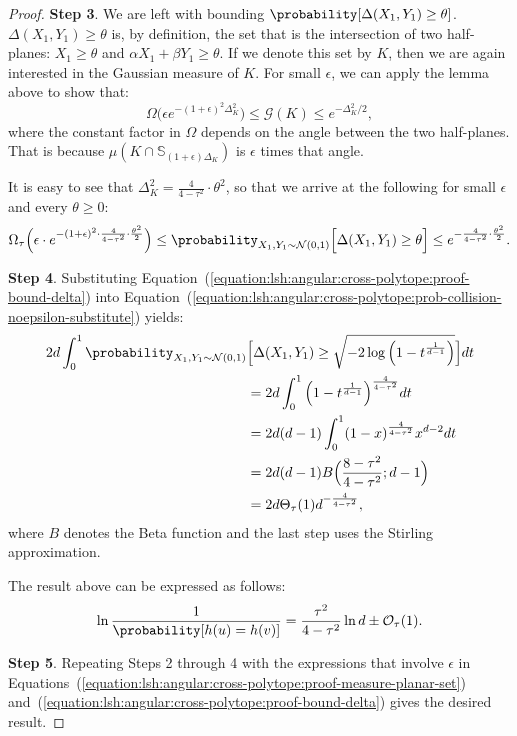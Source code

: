 \begin{proof}
    \textbf{Step 3}. We are left with bounding $\probability[ \Delta(X_1, Y_1) \geq \theta ]$.
    $\Delta(X_1, Y_1) \geq \theta$ is, by definition, the set that is the intersection of two
    half-planes: $X_1 \geq \theta$ and $\alpha X_1 + \beta Y_1 \geq \theta$. If we denote this set
    by $K$, then we are again interested in the Gaussian measure of $K$. For small $\epsilon$,
    we can apply the lemma above to show that:
    \begin{equation}
        \Omega \Big( \epsilon e^{-(1 + \epsilon)^2 \Delta_K^2} \Big) \leq \mathcal{G}(K) \leq e^{-\Delta^2_K /2},
    \end{equation}
    where the constant factor in $\Omega$ depends on the angle between the two half-planes. That is
    because $\mu(K \cap \mathbb{S}_{(1+ \epsilon) \Delta_K})$ is $\epsilon$ times that angle.

    It is easy to see that $\Delta_K^2 = \frac{4}{4 - \tau^2} \cdot \theta^2$, so that we arrive at the following
    for small $\epsilon$ and every $\theta \geq 0$:
    \begin{equation}
        \label{equation:lsh:angular:cross-polytope:proof-bound-delta}
        \Omega_\tau \Big( \epsilon \cdot e^{-(1 + \epsilon)^2 \cdot \frac{4}{4 - \tau^2}\cdot \frac{\theta^2}{2}} \Big) \leq
        \probability_{X_1, Y_1 \sim \mathcal{N}(0, 1)} \Big[ \Delta(X_1, Y_1) \geq \theta \Big] \leq
        e^{- \frac{4}{4 - \tau^2}\cdot \frac{\theta^2}{2}}.
    \end{equation}

    \textbf{Step 4}. Substituting Equation~(\ref{equation:lsh:angular:cross-polytope:proof-bound-delta}) into
    Equation~(\ref{equation:lsh:angular:cross-polytope:prob-collision-noepsilon-substitute}) yields:
    \begin{align*}
        2d \int_0^1 \probability_{X_1, Y_1 \sim \mathcal{N}(0, 1)} &\Big[ \Delta(X_1, Y_1) \geq \sqrt{-2 \log \Big( 1 - t^{\frac{1}{d - 1}} \Big)}  \Big] dt \\
        &= 2d \int_0^1 \Big( 1 - t^{\frac{1}{d - 1}} \Big)^{\frac{4}{4 - \tau^2}}dt \\
        &= 2d(d-1) \int_0^1 (1 - x)^{\frac{4}{4 - \tau^2}} x^{d-2} dt \\
        &= 2d (d - 1) B\Big( \frac{8 - \tau^2}{4 - \tau^2}; d - 1 \Big) \\
        &= 2d \Theta_\tau(1) d^{-\frac{4}{4 - \tau^2}},
    \end{align*}
    where $B$ denotes the Beta function and the last step uses the Stirling approximation.

    The result above can be expressed as follows:
    \begin{equation*}
        \ln \frac{1}{\probability [ h(u) = h(v)]} = \frac{\tau^2}{4 - \tau^2} \ln d \pm \mathcal{O}_\tau(1).
    \end{equation*}

    \textbf{Step 5}. Repeating Steps 2 through 4 with the expressions that involve $\epsilon$ in
    Equations~(\ref{equation:lsh:angular:cross-polytope:proof-measure-planar-set})
    and~(\ref{equation:lsh:angular:cross-polytope:proof-bound-delta}) gives the desired result.
\end{proof}

